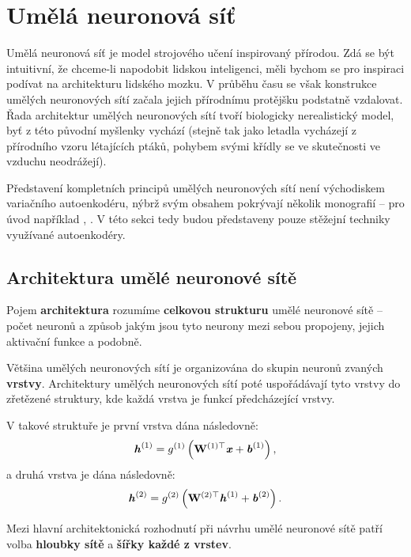 \section{Umělá neuronová síť}
\label{neural_network}
Umělá neuronová síť je model strojového učení inspirovaný přírodou.
Zdá se být intuitivní, že chceme-li napodobit lidskou inteligenci, měli bychom se pro inspiraci podívat na architekturu lidského mozku.
V průběhu času se však konstrukce umělých neuronových sítí začala jejich přírodnímu protějšku podstatně vzdalovat.
Řada architektur umělých neuronových sítí tvoří biologicky nerealistický model, byť z této původní myšlenky vychází (stejně tak jako letadla vycházejí z přírodního vzoru létajících ptáků, pohybem svými křídly se ve skutečnosti ve vzduchu neodrážejí). \cite{Geron2019}

Představení kompletních principů umělých neuronových sítí není východiskem variačního autoenkodéru, nýbrž svým obsahem pokrývají několik monografií – pro úvod například \cite{Chollet2017}, \cite{Geron2019}.
V této sekci tedy budou představeny pouze stěžejní techniky využívané autoenkodéry.
\subsection{Architektura umělé neuronové sítě}
Pojem \textbf{architektura} rozumíme \textbf{celkovou strukturu} umělé neuronové sítě – počet neuronů a způsob jakým jsou tyto neurony mezi sebou propojeny, jejich aktivační funkce a podobně.

Většina umělých neuronových sítí je organizována do skupin neuronů zvaných \textbf{vrstvy}.
Architektury umělých neuronových sítí poté uspořádávají tyto vrstvy do zřetězené struktury, kde každá vrstva je funkcí předcházející vrstvy. \cite{Goodfellow2016}

V takové struktuře je první vrstva dána následovně:
\begin{equation}
    \textbf{\emph{h}}^{(1)} = g^{(1)} \left( \mathbf{W}^{(1)\top}\textbf{\emph{x}}+\textbf{\emph{b}}^{(1)} \right),
\end{equation}
a druhá vrstva je dána následovně:
\begin{equation}
    \textbf{\emph{h}}^{(2)} = g^{(2)} \left( \mathbf{W}^{(2)\top}\textbf{\emph{h}}^{(1)}+\textbf{\emph{b}}^{(2)} \right).
\end{equation}

Mezi hlavní architektonická rozhodnutí při návrhu umělé neuronové sítě patří volba \textbf{hloubky sítě} a \textbf{šířky každé z vrstev}.
